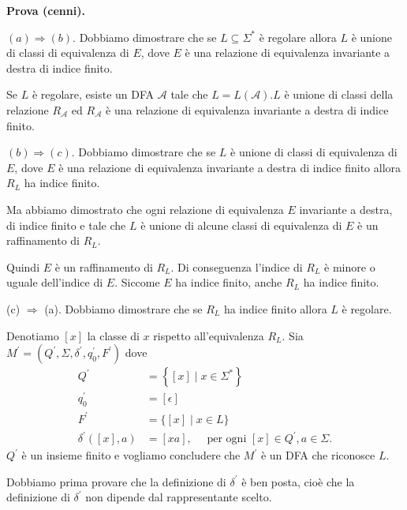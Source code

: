 \textbf{Prova (cenni).}

\vspace{5mm}

$(a) \Rightarrow(b) .$ Dobbiamo dimostrare che se $L \subseteq \Sigma^{*}$ è regolare allora $L$ è unione di classi di equivalenza di $E$, dove $E$ è una relazione di equivalenza invariante a destra di indice finito.

Se $L$ è regolare, esiste un DFA $\mathcal{A}$ tale che $L=L(\mathcal{A}) . L$ è unione di classi della relazione $R_{\mathcal{A}}$ ed $R_{\mathcal{A}}$ è una relazione di equivalenza invariante a destra di indice finito.

\vspace{5mm}

$(b) \Rightarrow(c)$. Dobbiamo dimostrare che se $L$ è unione di classi di equivalenza di $E$, dove $E$ è una relazione di equivalenza invariante a destra di indice finito allora $R_{L}$ ha indice finito.

Ma abbiamo dimostrato che ogni relazione di equivalenza $E$ invariante a destra, di indice finito e tale che $L$ è unione di alcune classi di equivalenza di $E$ è un raffinamento di $R_{L}$.

Quindi $E$ è un raffinamento di $R_{L}$. Di conseguenza l'indice di $R_{L}$ è minore o uguale dell'indice di $E$. Siccome $E$ ha indice finito, anche $R_{L}$ ha indice finito.

\vspace{5mm}

(c) $\Rightarrow$ (a). Dobbiamo dimostrare che se $R_{L}$ ha indice finito allora $L$ è regolare.

Denotiamo $[x]$ la classe di $x$ rispetto all'equivalenza $R_{L}$.
Sia $M^{\prime}=\left(Q^{\prime}, \Sigma, \delta^{\prime}, q_{0}^{\prime}, F^{\prime}\right)$ dove
$$
\begin{aligned}
Q^{\prime} &=\left\{[x] \mid x \in \Sigma^{*}\right\} \\
q_{0}^{\prime} &=[\epsilon] \\
F^{\prime} &=\{[x] \mid x \in L\} \\
\delta^{\prime}([x], a) &=[x a], \quad \text { per ogni }[x] \in Q^{\prime}, a \in \Sigma .
\end{aligned}
$$
$Q^{\prime}$ è un insieme finito e vogliamo concludere che $M^{\prime}$ è un DFA che riconosce $L$.

Dobbiamo prima provare che la definizione di $\delta^{\prime}$ è ben posta, cioè che la definizione di $\delta^{\prime}$ non dipende dal rappresentante scelto.

